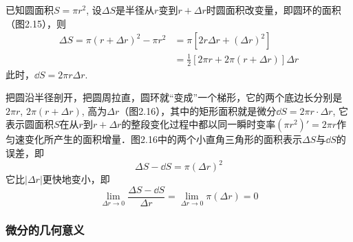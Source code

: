 \begin{solution}
    已知圆面积$S=\pi r^2$, 设$\Delta S$是半径从$r$变到$r+\Delta r$时圆面积改变量，即圆环的面积（图2.15），则
\begin{align*}
    \Delta S=\pi(r+\Delta r)^2-\pi r^2&=\pi\left[2r\Delta r+(\Delta r)^2\right]\\
    &=\frac{1}{2}\left[2\pi r+2\pi(r+\Delta r)\right]\Delta r
\end{align*}
此时，$\dd S=2\pi r\Delta r$.

\begin{figure}[htp]\centering
	\begin{minipage}[t]{0.48\textwidth}
		\centering
    \caption{}
\end{minipage}
\begin{minipage}[t]{0.48\textwidth}
    \centering
{}
\caption{}
\end{minipage}
\end{figure}

把圆沿半径剖开，把圆周拉直，圆环就“变成”一个梯形，它的两个底边长分别是$2\pi r$, $2\pi(r+\Delta r)$, 高为$\Delta r$（图2.16），其中的矩形面积就是微分$\dd S=2\pi r\cdot \Delta r$, 它表示圆面积$S$在从$r$到$r+\Delta r$的整段变化过程中都以同一瞬时变率$(\pi r^2)'=2\pi r$作匀速变化所产生的面积增量．图2.16中的两个小直角三角形的面积表示$\Delta S$与$\dd S$的误差，即
\[\Delta S-\dd S=\pi  (\Delta r)^2\]
它比$|\Delta r|$更快地变小，即
\[\lim_{\Delta r\to 0}\frac{\Delta S-\dd S}{\Delta r}=\lim_{\Delta r\to 0}\pi(\Delta r)=0\]
\end{solution}

\subsubsection{微分的几何意义}

